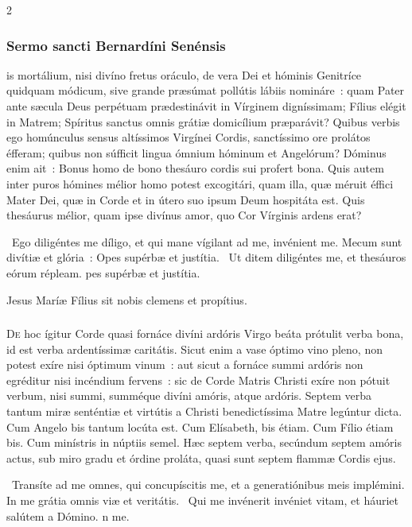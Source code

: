 \documentclass[9pt,twoside]{extarticle}
\begin{document}
\begin{multicols}{2}
\subsubsection*{\center \normalfont Sermo sancti Bernardíni Senénsis\\ }
is mortálium, nisi divíno fretus oráculo, de vera Dei et hóminis Genitríce quidquam módicum, sive grande præsúmat pollútis lábiis nomináre~: quam Pater ante sæcula Deus perpétuam prædestinávit in Vírginem digníssimam; Fílius elégit in Matrem; Spíritus sanctus omnis grátiæ domicílium præparávit? Quibus verbis ego homúnculus sensus altíssimos Virgínei Cordis, sanctíssimo ore prolátos éfferam; quibus non súfficit lingua ómnium hóminum et Angelórum? Dóminus enim ait~: Bonus homo de bono thesáuro cordis sui profert bona. Quis autem inter puros hómines mélior homo potest excogitári, quam illa, quæ méruit éffici Mater Dei, quæ in Corde et in útero suo ipsum Deum hospitáta est. Quis thesáurus mélior, quam ipse divínus amor, quo Cor Vírginis ardens erat?

~Ego diligéntes me díligo, et qui mane vígilant ad me, invénient me. Mecum sunt divítiæ et glória~: \textred{*} Opes supérbæ et justítia. ~Ut ditem diligéntes me, et thesáuros eórum répleam. pes supérbæ et justítia.

\smallskip
{\small {} Jesus Maríæ Fílius sit nobis clemens et propítius.}

\subsubsection*{\center \normalfont {}}
\lettrine{D}{e} hoc ígitur Corde quasi fornáce divíni ardóris Virgo beáta prótulit verba bona, id est verba ardentíssimæ caritátis. Sicut enim a vase óptimo vino pleno, non potest exíre nisi óptimum vinum~: aut sicut a fornáce summi ardóris non egréditur nisi incéndium fervens~: sic de Corde Matris Christi exíre non pótuit verbum, nisi summi, summéque divíni amóris, atque ardóris. Septem verba tantum miræ senténtiæ et virtútis a Christi benedictíssima Matre legúntur dicta. Cum Angelo bis tantum locúta est. Cum Elísabeth, bis étiam. Cum Fílio étiam bis. Cum minístris in núptiis semel. Hæc septem verba, secúndum septem amóris actus, sub miro gradu et órdine proláta, quasi sunt septem flammæ Cordis ejus.

\smallskip
{}~Transíte ad me omnes, qui concupíscitis me, et a generatiónibus meis implémini. \textred{*} In me grátia omnis viæ et veritátis. ~Qui me invénerit invéniet vitam, et háuriet salútem a Dómino. n me.


\end{multicols}
\end{document}

